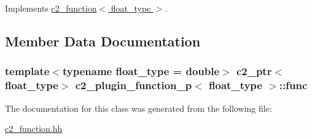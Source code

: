 Implements \hyperlink{classc2__function_a44e0201159111350be7f746fc9026f67}{c2\+\_\+function$<$ float\+\_\+type $>$}.



\subsection{Member Data Documentation}
\subsubsection[{\texorpdfstring{func}{func}}]{\setlength{\rightskip}{0pt plus 5cm}template$<$typename float\+\_\+type = double$>$ {\bf c2\+\_\+ptr}$<$float\+\_\+type$>$ {\bf c2\+\_\+plugin\+\_\+function\+\_\+p}$<$ float\+\_\+type $>$\+::func\hspace{0.3cm}{\ttfamily [protected]}}\hypertarget{classc2__plugin__function__p_a9f3ca0419f50aa9792da2a9b54716849}{}\label{classc2__plugin__function__p_a9f3ca0419f50aa9792da2a9b54716849}


The documentation for this class was generated from the following file\+:\begin{DoxyCompactItemize}
\item 
\hyperlink{c2__function_8hh}{c2\+\_\+function.\+hh}\end{DoxyCompactItemize}
